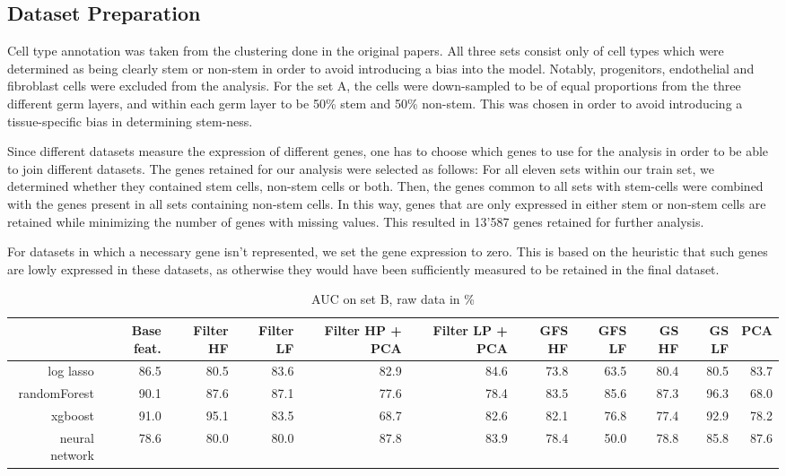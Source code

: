 \documentclass[10pt,conference,compsocconf]{IEEEtran}
\begin{document}
\subsection{Dataset Preparation}\label{supp:data_prep}
Cell type annotation was taken from the clustering done in the original papers. All three sets consist only of cell types which were determined as being clearly stem or non-stem in order to avoid introducing a bias into the model. Notably, progenitors, endothelial and fibroblast cells were excluded from the analysis. For the set A, the cells were down-sampled to be of equal proportions from the three different germ layers, and within each germ layer to be 50\% stem and 50\% non-stem. This was chosen in order to avoid introducing a tissue-specific bias in determining stem-ness. 
\par
Since different datasets measure the expression of different genes, one has to choose which genes to use for the analysis in order to be able to join different datasets. The genes retained for our analysis were selected as follows: For all eleven sets within our train set, we determined whether they contained stem cells, non-stem cells or both. Then, the genes common to all sets with stem-cells were combined with the genes present in all sets containing non-stem cells. In this way, genes that are only expressed in either stem or non-stem cells are retained while minimizing the number of genes with missing values. This resulted in 13'587 genes retained for further analysis.
\par
For datasets in which a necessary gene isn't represented, we set the gene expression to zero. This is based on the heuristic that such genes are lowly expressed in these datasets, as otherwise they would have been sufficiently measured to be retained in the final dataset. 

\onecolumn
\begin{table}[H]
	\centering
	\begin{tabular}{r|rrrrrrrrrr}
	\hline
	& Base feat. & Filter HF & Filter LF & Filter HP + PCA & Filter LP + PCA & GFS HF & GFS LF&GS HF &GS LF & PCA  \\ \hline
	 log lasso & 86.5 & 80.5 & 83.6 & 82.9 & 84.6 & 73.8 & 63.5 & 80.4 & 80.5 & 83.7 \\
	 randomForest & 90.1 & 87.6 & 87.1 & 77.6 & 78.4 & 83.5 & 85.6 & 87.3 & 96.3 & 68.0 \\
	 xgboost & 91.0 & 95.1 & 83.5 & 68.7 & 82.6 & 82.1 & 76.8 & 77.4 & 92.9 & 78.2 \\
	 neural network & 78.6 & 80.0 & 80.0 & 87.8 & 83.9 & 78.4 & 50.0 & 78.8 & 85.8 & 87.6 \\
	\hline
	\end{tabular}
	\caption{AUC on set B, raw data in \%}
	\vspace{-6mm}
\end{table}
\end{document}
